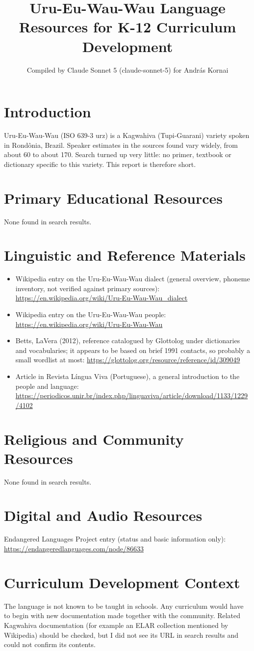 \documentclass[12pt]{article}
\title{Uru-Eu-Wau-Wau Language Resources for K-12 Curriculum Development}
\author{Compiled by Claude Sonnet 5 (claude-sonnet-5) for Andr\'as Kornai}
\date{}
\begin{document}
\maketitle
\section{Introduction}
Uru-Eu-Wau-Wau (ISO 639-3 urz) is a Kagwahiva (Tupi-Guarani) variety spoken in Rond\^onia, Brazil. Speaker estimates in the sources found vary widely, from about 60 to about 170. Search turned up very little: no primer, textbook or dictionary specific to this variety. This report is therefore short.
\section{Primary Educational Resources}
None found in search results.
\section{Linguistic and Reference Materials}
\begin{itemize}
\item Wikipedia entry on the Uru-Eu-Wau-Wau dialect (general overview, phoneme inventory, not verified against primary sources): \url{https://en.wikipedia.org/wiki/Uru-Eu-Wau-Wau_dialect}
\item Wikipedia entry on the Uru-Eu-Wau-Wau people: \url{https://en.wikipedia.org/wiki/Uru-Eu-Wau-Wau}
\item Betts, LaVera (2012), reference catalogued by Glottolog under dictionaries and vocabularies; it appears to be based on brief 1991 contacts, so probably a small wordlist at most: \url{https://glottolog.org/resource/reference/id/309049}
\item Article in Revista Língua Viva (Portuguese), a general introduction to the people and language: \url{https://periodicos.unir.br/index.php/linguaviva/article/download/1133/1229/4102}
\end{itemize}
\section{Religious and Community Resources}
None found in search results.
\section{Digital and Audio Resources}
Endangered Languages Project entry (status and basic information only): \url{https://endangeredlanguages.com/node/86633}
\section{Curriculum Development Context}
The language is not known to be taught in schools. Any curriculum would have to begin with new documentation made together with the community. Related Kagwahiva documentation (for example an ELAR collection mentioned by Wikipedia) should be checked, but I did not see its URL in search results and could not confirm its contents.
\end{document}
